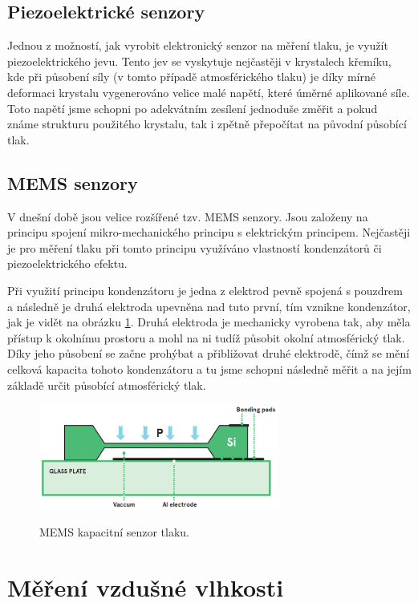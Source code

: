 \subsection{Piezoelektrické senzory}

Jednou z možností, jak vyrobit elektronický senzor na měření tlaku, je využít piezoelektrického jevu. Tento jev se vyskytuje nejčastěji v krystalech křemíku, kde při působení síly (v tomto případě atmosférického tlaku) je díky mírné deformaci krystalu vygenerováno velice malé napětí, které úměrné aplikované síle. Toto napětí jsme schopni po adekvátním zesílení jednoduše změřit a pokud známe strukturu použitého krystalu, tak i zpětně přepočítat na původní působící tlak.

\subsection{MEMS senzory}

V dnešní době jsou velice rozšířené tzv. MEMS senzory. Jsou založeny na principu spojení mikro-mechanického principu s elektrickým principem. Nejčastěji je pro měření tlaku při tomto principu využíváno vlastností kondenzátorů či piezoelektrického efektu.

Při využití principu kondenzátoru je jedna z elektrod pevně spojená s pouzdrem a následně je druhá elektroda upevněna nad tuto první, tím vznikne kondenzátor, jak je vidět na obrázku \ref{fig_memsCapacitiveSensor}. Druhá elektroda je mechanicky vyrobena tak, aby měla přístup k okolnímu prostoru a mohl na ni tudíž působit okolní atmosférický tlak. Díky jeho působení se začne prohýbat a přibližovat druhé elektrodě, čímž se mění celková kapacita tohoto kondenzátoru a tu jsme schopni následně měřit a na jejím základě určit působící atmosférický tlak.

\begin{figure}
    \includegraphics[width=0.7\textwidth]{obrazky/MEMS_capacitive_sensor.jpg}
    \label{fig_memsCapacitiveSensor}
    \caption{MEMS kapacitní senzor tlaku. \cite{AvnetMEMS}}
\end{figure}

\section{Měření vzdušné vlhkosti}


